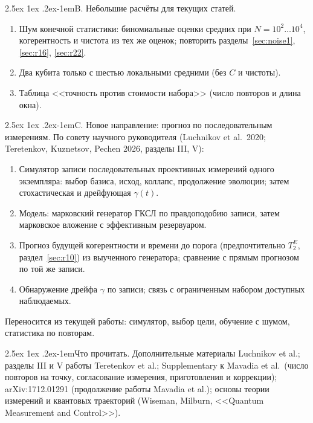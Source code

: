 \documentclass[12pt,a4paper]{report}
\makeatletter
\renewcommand\paragraph{\@startsection{paragraph}{4}{\z@}%
  {2.5ex \@plus1ex \@minus.2ex}{-1em}{\normalfont\normalsize\bfseries}}
\numberwithin{equation}{chapter}
\makeatother
\begin{document}
{\paragraph{B. Небольшие расчёты для текущих статей.}
\begin{enumerate}
\item Шум конечной статистики: биномиальные оценки средних при
      $N=10^2\ldots10^4$, когерентность и чистота из тех же оценок;
      повторить разделы~\ref{sec:noise1}, \ref{sec:r16}, \ref{sec:r22}.
\item Два кубита только с шестью локальными средними (без $C$ и
      чистоты).
\item Таблица <<точность против стоимости набора>> (число повторов и длина
      окна).
\end{enumerate}

\paragraph{C. Новое направление: прогноз по последовательным измерениям.}
По совету научного руководителя (Luchnikov et al.\ 2020;
Teretenkov, Kuznetsov, Pechen 2026, разделы III, V):
\begin{enumerate}
\item Симулятор записи последовательных проективных измерений одного
      экземпляра: выбор базиса, исход, коллапс, продолжение эволюции; затем
      стохастическая и дрейфующая $\gamma(t)$.
\item Модель: марковский генератор ГКСЛ по правдоподобию записи, затем
      марковское вложение с эффективным резервуаром.
\item Прогноз будущей когерентности и времени до порога (предпочтительно
      $T_2^E$, раздел~\ref{sec:r10}) из выученного генератора; сравнение с
      прямым прогнозом по той же записи.
\item Обнаружение дрейфа $\gamma$ по записи; связь с ограниченным набором
      доступных наблюдаемых.
\end{enumerate}
Переносится из текущей работы: симулятор, выбор цели, обучение с шумом,
статистика по повторам.

\paragraph{Что прочитать.} Дополнительные материалы Luchnikov et al.;
разделы III и V работы Teretenkov et al.; Supplementary к Mavadia et al.\
(число повторов на точку, согласование измерения, приготовления и
коррекции); arXiv:1712.01291 (продолжение работы Mavadia et al.);
основы теории измерений и квантовых траекторий (Wiseman, Milburn,
<<Quantum Measurement and Control>>).

}
\end{document}
